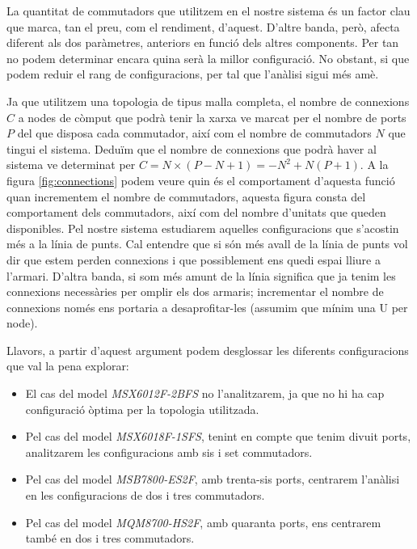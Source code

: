 La quantitat de commutadors que utilitzem en el nostre sistema és un factor clau que marca,
tan el preu, com el rendiment, d'aquest. D'altre banda, però, afecta diferent als dos paràmetres,
anteriors en funció dels altres components. Per tan no podem determinar encara quina serà la
millor configuració. No obstant, si que podem reduir el rang de configuracions, per tal que
l'anàlisi sigui més amè.

Ja que utilitzem una topologia de tipus malla completa, el nombre de connexions $C$ a nodes de còmput
que podrà tenir la xarxa ve marcat per el nombre de ports $P$ del que disposa cada commutador, així
com el nombre de commutadors $N$ que tingui el sistema. Deduïm que el nombre de connexions
que podrà haver al sistema ve determinat per $C = N \times ( P - N + 1 ) = -N^2 + N(P+1)$.
A la figura \ref{fig:connections} podem veure quin és el comportament d'aquesta funció quan incrementem
el nombre de commutadors, aquesta figura consta del comportament dels commutadors, així com del nombre 
d'unitats que queden disponibles. Pel nostre sistema estudiarem aquelles configuracions que s'acostin 
més a la línia de punts. Cal entendre que si són més avall de la línia de punts vol dir que estem perden connexions
i que possiblement ens quedi espai lliure a l'armari. D'altra banda, si som més amunt de la línia 
significa que ja tenim les connexions necessàries per omplir els dos armaris; incrementar el nombre de connexions
només ens portaria a desaprofitar-les (assumim que mínim una U per node).

Llavors, a partir d'aquest argument podem desglossar les diferents configuracions que val la pena explorar:
\begin{itemize}
  \item El cas del model \textit{MSX6012F-2BFS} no l'analitzarem, ja que no hi ha cap configuració òptima per la topologia utilitzada.
  \item Pel cas del model \textit{MSX6018F-1SFS}, tenint en compte que tenim divuit ports, analitzarem les configuracions amb sis i set commutadors.
  \item Pel cas del model \textit{MSB7800-ES2F}, amb trenta-sis ports, centrarem l'anàlisi en les configuracions de dos i tres commutadors.
  \item Pel cas del model \textit{MQM8700-HS2F}, amb quaranta ports, ens centrarem també en dos i tres commutadors.
\end{itemize}

